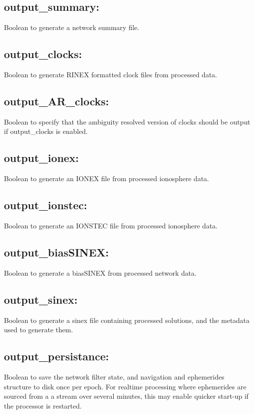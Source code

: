 \subsection{output\_summary:}
Boolean to generate a network summary file.

\subsection{output\_clocks:}
Boolean to generate RINEX formatted clock files from processed data.

\subsection{output\_AR\_clocks:}
Boolean to specify that the ambiguity resolved version of clocks should be output if output\_clocks is enabled.

\subsection{output\_ionex:}
Boolean to generate an IONEX file from processed ionosphere data.

\subsection{output\_ionstec:}
Boolean to generate an IONSTEC file from processed ionosphere data.

\subsection{output\_biasSINEX:}
Boolean to generate a biasSINEX from processed network data.

\subsection{output\_sinex:}
Boolean to generate a sinex file containing processed solutions, and the metadata used to generate them.

\subsection{output\_persistance:}
Boolean to save the network filter state, and navigation and ephemerides structure to disk once per epoch. For realtime processing where ephemerides are sourced from a a stream over several minutes, this may enable quicker start-up if the processor is restarted.

